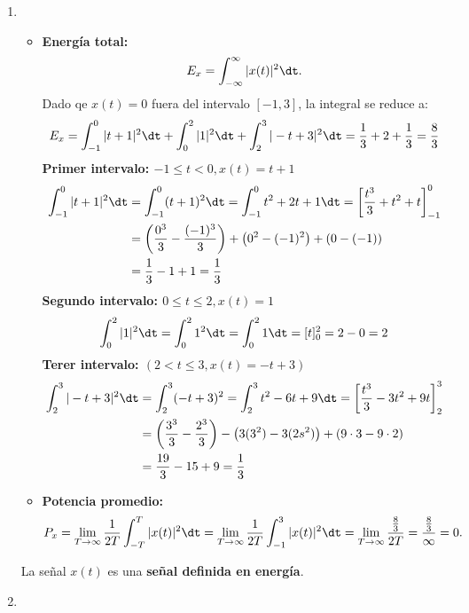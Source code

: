 \begin{enumerate}[label=\color{red}\textbf{\arabic*)}]
\item {}

    \begin{itemize}[label=\textbullet]
        \item \textbf{Energía total:} \[
        E_x=\int_{-\infty}^{\infty} |x(t)|^2\dt. 
        \]  
        Dado qe $x(t)=0$ fuera del intervalo  $[-1,3]$, la integral se reduce a:  \[
        E_x=\int_{-1}^{0} |t+1|^2\dt+\int_{0}^{2} |1|^2\dt+\int_{2}^{3} |-t+3|^2\dt =\dfrac{1}{3}+2+\dfrac{1}{3}=\dfrac{8}{3}  
        \] 
        \textbf{Primer intervalo: $-1\le t<0,x(t)=t+1$} \[
\begin{aligned}
    \int_{-1}^{0} |t+1|^2\dt&=\int_{-1}^{0} (t+1)^2\dt=\int_{-1}^{0} t^2+2t+1\dt=\left[ \dfrac{t^3}{3}+t^2+t \right]_{-1}^0\\
                            &=\left( \dfrac{0^3}{3}-\dfrac{(-1)^3}{3} \right) +\left( 0^2-(-1)^2 \right)+(0-(-1))\\
                            &=\dfrac{1}{3}-1+1=\dfrac{1}{3}
\end{aligned}
        \]
        \textbf{Segundo intervalo: $0\le t\le 2,x(t)=1$} \[
            \int_{0}^{2} |1|^2\dt=\int_{0}^{2} 1^2\dt=\int_{0}^{2} 1\dt=[t]_0^2=2-0=2   
        \] 
        \textbf{Terer intervalo: $(2<t\le 3,x(t)=-t+3)$} \[
            \begin{aligned}
                \int_{2}^{3} |-t+3|^2\dt&=\int_{2}^{3} (-t+3)^2= \int_{2}^{3} t^2-6t+9\dt=\left[ \dfrac{t^3}{3}-3t^2+9t \right]_2^3\\
                                        &= \left( \dfrac{3^3}{3}-\dfrac{2^3}{3} \right) - \left( 3(3^2)-3(2s^2) \right)+(9\cdot 3-9\cdot 2)  \\
                                        &= \dfrac{19}{3}-15+9=\dfrac{1}{3} \\
            \end{aligned}
        \] 
    \item \textbf{Potencia promedio:} \[
    P_x=\lim_{T \to \infty} \dfrac{1}{2T}\int_{-T}^{T} |x(t)|^2\dt=\lim_{T \to \infty} \dfrac{1}{2T}\int_{-1}^{3} |x(t)|^2\dt=\lim_{T \to \infty} \dfrac{\frac{8}{3} }{2T}=\dfrac{\frac{8}{3} }{\infty}=0. 
    \]  
    \end{itemize}
    La señal $x(t)$ es una  \textbf{señal definida en energía}. 
\item {}
\end{enumerate}
